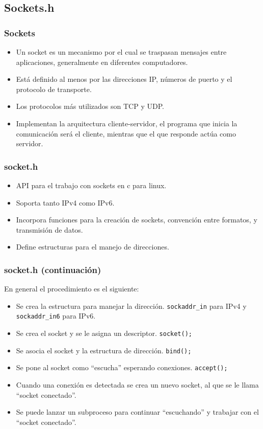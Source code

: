 \subsection{Sockets.h}
\begin{frame}
  \frametitle{Sockets}
  \begin{itemize}
  \item	
	  Un socket es un mecanismo por el cual se traspasan mensajes entre
	  aplicaciones, generalmente en diferentes computadores.
  \item	
	  Está definido al menos por las direcciones IP, números de puerto y el 
	  protocolo de transporte.
  \item
	  Los protocolos más utilizados son TCP y UDP.
  \item
	  Implementan la arquitectura cliente-servidor, el programa que inicia la 
	  comunicación será el cliente, mientras que el que responde actúa como
	  servidor.
  \end{itemize}
\end{frame}

\begin{frame}
  \frametitle{socket.h}
  \begin{itemize}
  \item	
	  API para el trabajo con sockets en c para linux.
  \item
	  Soporta tanto IPv4 como IPv6.
  \item
	  Incorpora funciones para la creación de sockets, convención entre
	  formatos, y transmisión de datos.
  \item
	  Define estructuras para el manejo de direcciones.
  \end{itemize}
\end{frame}

\begin{frame}
	\frametitle{socket.h (continuación)}
	En general el procedimiento es el siguiente:
	\begin{itemize}
		\item
			Se crea la estructura para manejar la dirección.
			\texttt{sockaddr\_in} para IPv4 y \texttt{sockaddr\_in6} para IPv6.
		\item
			Se crea el socket y se le asigna un descriptor.
			\texttt{socket();}
		\item
			Se asocia el socket y la estructura de dirección. \texttt{bind();} 
		\item
			Se pone al socket como ``escucha'' esperando conexiones.
			\texttt{accept();}
		\item
			Cuando una conexión es detectada se crea un nuevo socket, al que se
			le llama ``socket conectado''.
		\item
			Se puede lanzar un subproceso para continuar ``escuchando'' y 
			trabajar con el ``socket conectado''.
	\end{itemize}
\end{frame}
			
\frame{\titlepage}
